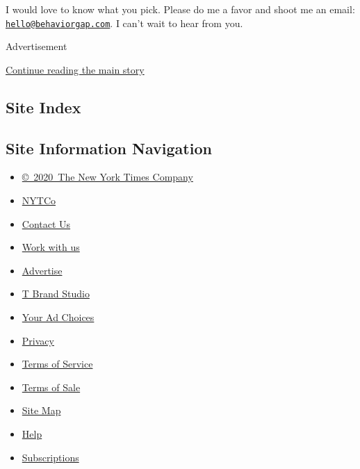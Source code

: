I would love to know what you pick. Please do me a favor and shoot me an
email:
\href{mailto:hello@behaviorgap.com}{\nolinkurl{hello@behaviorgap.com}}.
I can't wait to hear from you.

Advertisement

\protect\hyperlink{after-bottom}{Continue reading the main story}

\hypertarget{site-index}{%
\subsection{Site Index}\label{site-index}}

\hypertarget{site-information-navigation}{%
\subsection{Site Information
Navigation}\label{site-information-navigation}}

\begin{itemize}
\tightlist
\item
  \href{https://help.nytimes3xbfgragh.onion/hc/en-us/articles/115014792127-Copyright-notice}{©~2020~The
  New York Times Company}
\end{itemize}

\begin{itemize}
\tightlist
\item
  \href{https://www.nytco.com/}{NYTCo}
\item
  \href{https://help.nytimes3xbfgragh.onion/hc/en-us/articles/115015385887-Contact-Us}{Contact
  Us}
\item
  \href{https://www.nytco.com/careers/}{Work with us}
\item
  \href{https://nytmediakit.com/}{Advertise}
\item
  \href{http://www.tbrandstudio.com/}{T Brand Studio}
\item
  \href{https://www.nytimes3xbfgragh.onion/privacy/cookie-policy\#how-do-i-manage-trackers}{Your
  Ad Choices}
\item
  \href{https://www.nytimes3xbfgragh.onion/privacy}{Privacy}
\item
  \href{https://help.nytimes3xbfgragh.onion/hc/en-us/articles/115014893428-Terms-of-service}{Terms
  of Service}
\item
  \href{https://help.nytimes3xbfgragh.onion/hc/en-us/articles/115014893968-Terms-of-sale}{Terms
  of Sale}
\item
  \href{https://spiderbites.nytimes3xbfgragh.onion}{Site Map}
\item
  \href{https://help.nytimes3xbfgragh.onion/hc/en-us}{Help}
\item
  \href{https://www.nytimes3xbfgragh.onion/subscription?campaignId=37WXW}{Subscriptions}
\end{itemize}
